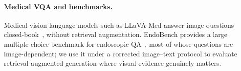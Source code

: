 \paragraph{Medical VQA and benchmarks.}
Medical vision-language models such as LLaVA-Med answer image questions
closed-book~\cite{li2023llavamed}, without retrieval augmentation. EndoBench
provides a large multiple-choice benchmark for endoscopic
QA~\cite{endobench}, most of whose questions are image-dependent; we use it under
a corrected image--text protocol to evaluate retrieval-augmented generation where
visual evidence genuinely matters.
